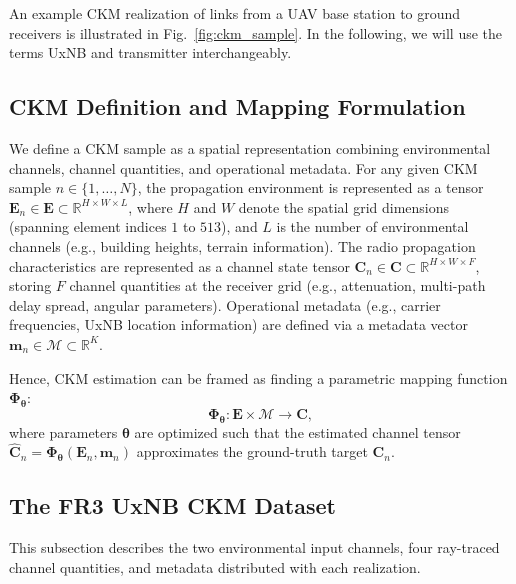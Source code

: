 \documentclass[10pt,conference,letterpaper]{IEEEtran}
\begin{document}
An example CKM realization of links from a UAV base station to ground receivers is illustrated in Fig.~\ref{fig:ckm_sample}. In the following, we will use the terms UxNB and transmitter interchangeably.

\subsection{CKM Definition and Mapping Formulation}
\label{sec:ckm_def}
We define a CKM sample as a spatial representation combining environmental channels, channel quantities, and operational metadata. For any given CKM sample $n \in \{1, \dots, N\}$, the propagation environment is represented as a tensor $\mathbf{E}_n \in \mathbf{E} \subset \mathbb{R}^{H \times W \times L}$, where $H$ and $W$ denote the spatial grid dimensions (spanning element indices $1$ to $513$), and $L$ is the number of environmental channels (e.g., building heights, terrain information). The radio propagation characteristics are represented as a channel state tensor $\mathbf{C}_n \in \mathbf{C} \subset \mathbb{R}^{H \times W \times F}$, storing $F$ channel quantities at the receiver grid (e.g., attenuation, multi-path delay spread, angular parameters). Operational metadata (e.g., carrier frequencies, UxNB location information) are defined via a metadata vector $\mathbf{m}_n \in \mathcal{M} \subset \mathbb{R}^K$.

Hence, CKM estimation can be framed as finding a parametric mapping function $\mathbf{\Phi}_{\boldsymbol{\theta}}$:
\begin{equation}
\mathbf{\Phi}_{\boldsymbol{\theta}} : \mathbf{E} \times \mathcal{M} \to \mathbf{C},
\label{eq:mapping_generic}
\end{equation}
where parameters $\boldsymbol{\theta}$ are optimized such that the estimated channel tensor $\widehat{\mathbf{C}}_n = \mathbf{\Phi}_{\boldsymbol{\theta}}(\mathbf{E}_n, \mathbf{m}_n)$ approximates the ground-truth target $\mathbf{C}_n$.

\subsection{The FR3 UxNB CKM Dataset}
\label{sec:dataset_details}
This subsection describes the two environmental input channels, four ray-traced channel quantities, and metadata distributed with each realization.
\end{document}
